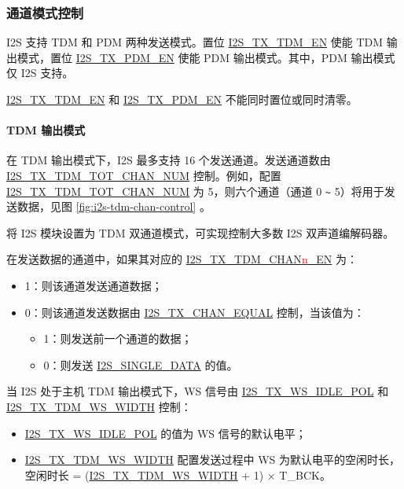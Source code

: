 \documentclass[main\_\_CN.tex]{subfiles}
\begin{document}
\subsubsection{通道模式控制}

\chipname{} I2S 支持 TDM 和 PDM 两种发送模式。置位 \hyperref[fielddesc:I2STXTDMEN]{I2S\_TX\_TDM\_EN} 使能 TDM 输出模式，置位 \hyperref[fielddesc:I2STXPDMEN]{I2S\_TX\_PDM\_EN} 使能 PDM 输出模式。其中，PDM 输出模式仅 I2S 支持。

\begin{tiplisting}
\hyperref[fielddesc:I2STXTDMEN]{I2S\_TX\_TDM\_EN} 和 \hyperref[fielddesc:I2STXPDMEN]{I2S\_TX\_PDM\_EN} 不能同时置位或同时清零。 
\end{tiplisting}

\paragraph{TDM 输出模式} \label{sec:i2s-chan-control-tdm-mode}

在 TDM 输出模式下，I2S 最多支持 16 个发送通道。发送通道数由 \hyperref[fielddesc:I2STXTDMTOTCHANNUM]{I2S\_TX\_TDM\_TOT\_CHAN\_NUM} 控制。例如，配置 \hyperref[fielddesc:I2STXTDMTOTCHANNUM]{I2S\_TX\_TDM\_TOT\_CHAN\_NUM} 为 5，则六个通道（通道 0 \verb+~+ 5）将用于发送数据，见图 \ref{fig:i2s-tdm-chan-control} \textit{}。 

\begin{tiplisting}
将 I2S 模块设置为 TDM 双通道模式，可实现控制大多数 I2S 双声道编解码器。
\end{tiplisting}

在发送数据的通道中，如果其对应的 \hyperref[fielddesc:I2STXTDMCHAN0EN]{I2S\_TX\_TDM\_CHAN{\textcolor{red}{n}}\_EN} 为：

\begin{itemize}
    \item 1：则该通道发送通道数据；
    \item 0：则该通道发送数据由 \hyperref[fielddesc:I2STXCHANEQUAL]{I2S\_TX\_CHAN\_EQUAL} 控制，当该值为：
    \begin{itemize}
        \item 1：则发送前一个通道的数据；
        \item 0：则发送 \hyperref[fielddesc:I2SSINGLEDATA]{I2S\_SINGLE\_DATA} 的值。
    \end{itemize}
\end{itemize}

当 I2S 处于主机 TDM 输出模式下，WS 信号由 \hyperref[fielddesc:I2STXWSIDLEPOL]{I2S\_TX\_WS\_IDLE\_POL} 和 \hyperref[fielddesc:I2STXTDMWSWIDTH]{I2S\_TX\_TDM\_WS\_WIDTH} 控制：
    \begin{itemize}
        \item \hyperref[fielddesc:I2STXWSIDLEPOL]{I2S\_TX\_WS\_IDLE\_POL} 的值为 WS 信号的默认电平；
        \item \hyperref[fielddesc:I2STXTDMWSWIDTH]{I2S\_TX\_TDM\_WS\_WIDTH} 配置发送过程中 WS 为默认电平的空闲时长，空闲时长 = (\hyperref[fielddesc:I2STXTDMWSWIDTH]{I2S\_TX\_TDM\_WS\_WIDTH} + 1) × T\_BCK。
    \end{itemize}
\end{document}
